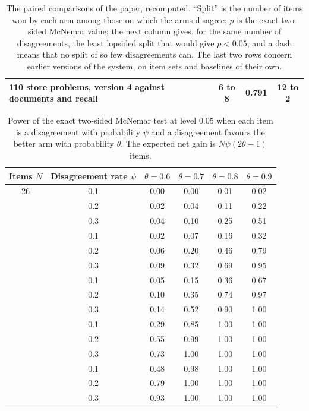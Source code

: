 \begin{table}[ht]
\begin{tabular}{p{6.3cm}ccc}
110 store problems, version 4 against documents and recall & 6 to 8 & 0.791 & 12 to 2\\
\bottomrule
\end{tabular}
\caption{The paired comparisons of the paper, recomputed. ``Split'' is the number of items won by each arm among those on which the arms disagree; $p$ is the exact two-sided McNemar value; the next column gives, for the same number of disagreements, the least lopsided split that would give $p<0.05$, and a dash means that no split of so few disagreements can. The last two rows concern earlier versions of the system, on item sets and baselines of their own.}
\label{tab:mcnemar-recomputed}
\end{table}

\begin{table}[ht]
\centering\small
\begin{tabular}{cccccc}
\toprule
Items $N$ & Disagreement rate $\psi$ & $\theta=0.6$ & $\theta=0.7$ & $\theta=0.8$ & $\theta=0.9$\\
\midrule
26 & 0.1 & 0.00 & 0.00 & 0.01 & 0.02\\
 & 0.2 & 0.02 & 0.04 & 0.11 & 0.22\\
 & 0.3 & 0.04 & 0.10 & 0.25 & 0.51\\
\addlinespace
61 & 0.1 & 0.02 & 0.07 & 0.16 & 0.32\\
 & 0.2 & 0.06 & 0.20 & 0.46 & 0.79\\
 & 0.3 & 0.09 & 0.32 & 0.69 & 0.95\\
\addlinespace
100 & 0.1 & 0.05 & 0.15 & 0.36 & 0.67\\
 & 0.2 & 0.10 & 0.35 & 0.74 & 0.97\\
 & 0.3 & 0.14 & 0.52 & 0.90 & 1.00\\
\addlinespace
584 & 0.1 & 0.29 & 0.85 & 1.00 & 1.00\\
 & 0.2 & 0.55 & 0.99 & 1.00 & 1.00\\
 & 0.3 & 0.73 & 1.00 & 1.00 & 1.00\\
\addlinespace
1000 & 0.1 & 0.48 & 0.98 & 1.00 & 1.00\\
 & 0.2 & 0.79 & 1.00 & 1.00 & 1.00\\
 & 0.3 & 0.93 & 1.00 & 1.00 & 1.00\\
\bottomrule
\end{tabular}
\caption{Power of the exact two-sided McNemar test at level $0.05$ when each item is a disagreement with probability $\psi$ and a disagreement favours the better arm with probability $\theta$. The expected net gain is $N\psi(2\theta-1)$ items.}
\label{tab:mcnemar-power}
\end{table}

